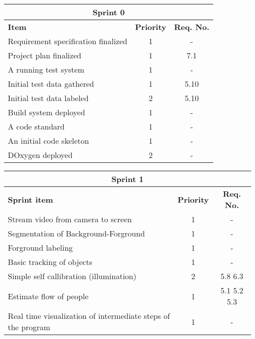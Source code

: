 \label{sprint0}
\begin{center}
	\begin{Large}
	\begin{tabular}{|p{10.5cm}|c|c|}
		\hline
		\multicolumn{3}{|c|}{\textbf{Sprint 0}} \\
		\hline
		\large{\textbf{Item}} & \large{\textbf{Priority}} & \large{\textbf{Req. No.}} \\
		\hline
		\large{Requirement specification finalized} & \large{1} & - \\
		\hline
		\large{Project plan finalized} & \large{1} & 7.1 \\
		\hline
		\large{A running test system} & \large{1} & - \\
		\hline
		\large{Initial test data gathered} & \large{1} & 5.10 \\
		\hline
		\large{Initial test data labeled} & \large{2} & 5.10 \\
		\hline
		\large{Build system deployed} & \large{1} & - \\
		\hline	
		\large{A code standard} & \large{1} & - \\
		\hline	
		\large{An initial code skeleton} & \large{1} & - \\
		\hline	
		\large{DOxygen deployed} & \large{2} & - \\
		\hline		
	\end{tabular}
	\end{Large}
\end{center}



\label{sprint1}
\begin{center}
	\begin{Large}
	\begin{tabular}{|p{10.5cm}|c|c|}
		\hline
		\multicolumn{3}{|c|}{\textbf{Sprint 1}} \\
		\hline
		\large{\textbf{Sprint item}} & \large{\textbf{Priority}} & \large{\textbf{Req. No.}} \\
		\hline
		\large{Stream video from camera to screen} & \large{1} & - \\
		\hline
		\large{Segmentation of Background-Forground} & \large{1} & - \\
		\hline
		\large{Forground labeling} & \large{1} & - \\
		\hline
		\large{Basic tracking of objects} & \large{1} & - \\
		\hline
		\large{Simple self callibration (illumination)} & \large{2} & 5.8 6.3 \\
		\hline
		\large{Estimate flow of people} & \large{1} & 5.1 5.2 5.3 \\
		\hline
		\large{Real time visualization of intermediate steps of the program} & \large{1} & - \\
		\hline
	\end{tabular}
	\end{Large}
\end{center}


